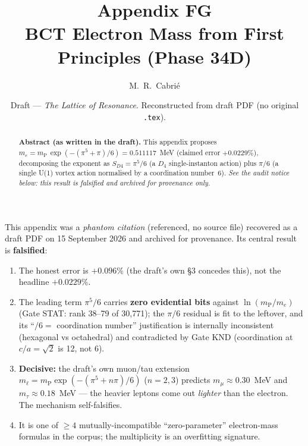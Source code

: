 \documentclass[aps,prl,preprint,superscriptaddress,floatfix]{revtex4-2}
\newcommand{\mP}{m_{\mathrm{P}}}
\newcommand{\me}{m_e}
\begin{document}
\title{Appendix FG\\ BCT Electron Mass from First Principles (Phase 34D)}
\author{M.~R.~Cabri\'{e}}
\date{Draft --- \textit{The Lattice of Resonance}. Reconstructed from draft PDF (no original \texttt{.tex}).}

\begin{abstract}
\textbf{Abstract (as written in the draft).}
This appendix proposes $\me = \mP\,\exp(-(\pi^5+\pi)/6) = 0.511117$~MeV
(claimed error $+0.0229\%$), decomposing the exponent as
$S_{D4}=\pi^5/6$ (a $D_4$ single-instanton action) plus $\pi/6$ (a single
U(1) vortex action normalised by a coordination number~6). \emph{See the audit
notice below: this result is falsified and archived for provenance only.}
\end{abstract}

\maketitle

\begin{tcolorbox}[colback=white,colframe=bctnavy,boxrule=1.2pt,arc=2pt,
  title=\textbf{COLD LEDGER AUDIT NOTICE --- RESULT FALSIFIED --- DO NOT CITE AS LIVE}]
\small
This appendix was a \emph{phantom citation} (referenced, no source file) recovered as a draft
PDF on 15 September 2026 and archived for provenance. Its central result is \textbf{falsified}:
\begin{enumerate}\itemsep0pt
\item The honest error is $+0.096\%$ (the draft's own \S3 concedes this), not the headline $+0.0229\%$.
\item The leading term $\pi^5/6$ carries \textbf{zero evidential bits} against $\ln(\mP/\me)$
(Gate STAT: rank 38--79 of 30{,}771); the $\pi/6$ residual is fit to the leftover, and its
``$/6 =$ coordination number'' justification is internally inconsistent (hexagonal vs octahedral)
and contradicted by Gate KND (coordination at $c/a=\sqrt2$ is 12, not 6).
\item \textbf{Decisive:} the draft's own muon/tau extension $m_\ell=\mP\exp(-(\pi^5+n\pi)/6)$
($n=2,3$) predicts $m_\mu\approx0.30$~MeV and $m_\tau\approx0.18$~MeV --- the heavier leptons come
out \emph{lighter} than the electron. The mechanism self-falsifies.
\item It is one of $\ge 4$ mutually-incompatible ``zero-parameter'' electron-mass formulas in the
corpus; the multiplicity is an overfitting signature.
\end{enumerate}
\end{tcolorbox}
\end{document}
